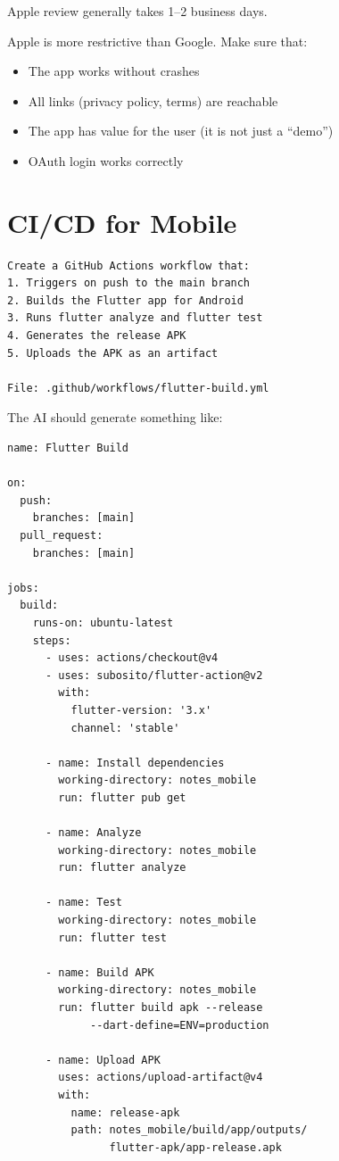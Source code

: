 Apple review generally takes 1--2 business days.

\begin{warnbox}
Apple is more restrictive than Google. Make sure that:
\begin{itemize}
  \item The app works without crashes
  \item All links (privacy policy, terms) are reachable
  \item The app has value for the user (it is not just a ``demo'')
  \item OAuth login works correctly
\end{itemize}
\end{warnbox}

\section{CI/CD for Mobile}

\begin{praticabox}[title={Hands-on --- GitHub Actions for automated builds}]
\begin{lstlisting}[language={}]
Create a GitHub Actions workflow that:
1. Triggers on push to the main branch
2. Builds the Flutter app for Android
3. Runs flutter analyze and flutter test
4. Generates the release APK
5. Uploads the APK as an artifact

File: .github/workflows/flutter-build.yml
\end{lstlisting}
\end{praticabox}

The AI should generate something like:

\begin{lstlisting}[language={},title={flutter-build.yml}]
name: Flutter Build

on:
  push:
    branches: [main]
  pull_request:
    branches: [main]

jobs:
  build:
    runs-on: ubuntu-latest
    steps:
      - uses: actions/checkout@v4
      - uses: subosito/flutter-action@v2
        with:
          flutter-version: '3.x'
          channel: 'stable'
      
      - name: Install dependencies
        working-directory: notes_mobile
        run: flutter pub get
      
      - name: Analyze
        working-directory: notes_mobile
        run: flutter analyze
      
      - name: Test
        working-directory: notes_mobile
        run: flutter test
      
      - name: Build APK
        working-directory: notes_mobile
        run: flutter build apk --release
             --dart-define=ENV=production
      
      - name: Upload APK
        uses: actions/upload-artifact@v4
        with:
          name: release-apk
          path: notes_mobile/build/app/outputs/
                flutter-apk/app-release.apk
\end{lstlisting}

